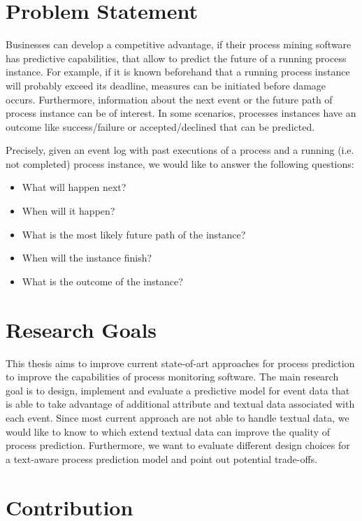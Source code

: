 \section{Problem Statement}

Businesses can develop a competitive advantage, if their process mining software has predictive capabilities, that allow to predict the future of a running process instance.
For example, if it is known beforehand that a running process instance will probably exceed its deadline, measures can be initiated before damage occurs.
Furthermore, information about the next event or the future path of process instance can be of interest.
In some scenarios, processes instances have an outcome like success/failure or accepted/declined that can be predicted.

Precisely, given an event log with past executions of a process and a running (i.e. not completed) process instance, we would like to answer the following questions:

\begin{itemize}
	\item What will happen next?
	\item When will it happen?
	\item What is the most likely future path of the instance?
	\item When will the instance finish?
	\item What is the outcome of the instance?
\end{itemize}



\section{Research Goals}

This thesis aims to improve current state-of-art approaches for process prediction to improve the capabilities of process monitoring software.
The main research goal is to design, implement and evaluate a predictive model for event data that is able to take advantage of additional attribute and textual data associated with each event.
Since most current approach are not able to handle textual data, we would like to know to which extend textual data can improve the quality of process prediction.
Furthermore, we want to evaluate different design choices for a text-aware process prediction model and point out potential trade-offs.

\section{Contribution}



